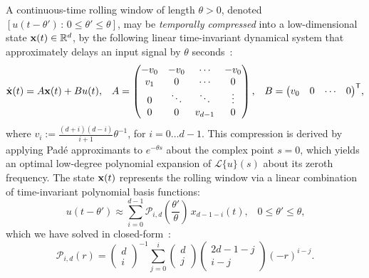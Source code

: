 A continuous-time rolling window of length $\theta > 0$, denoted $[ u(t - \theta') \,:\, 0 \le \theta' \le \theta ]$, may be \emph{temporally compressed} into a low-dimensional state $\mathbf{x}(t) \in \mathbb{R}^d$, by the following linear time-invariant dynamical system that approximately delays an input signal by $\theta$ seconds~\citep{voelker2018}:
\begin{equation} \label{eq:delay-system}
  \dot{\mathbf{x}}(t) = A\mathbf{x}(t) + Bu(t) \text{,} \quad
  A = \begin{pmatrix} -v_0 & -v_0 & \cdots & -v_0 \\ v_1 & 0 & \cdots & 0 \\ 0 & \ddots & \ddots & \vdots \\ 0 & 0 & v_{d-1} & 0\end{pmatrix} \text{,} \quad 
  B = {\begin{pmatrix} v_0 & 0 & \cdots & 0\end{pmatrix}}^\mathsf{T} \text{,} 
\end{equation}
where $v_i := \frac{(d+i)(d-i)}{i+1} \theta^{-1}$, %
for $i = 0 \ldots d-1$.
This compression is derived by applying Pad\'e approximants to $e^{-\theta s}$ about the complex point $s=0$, which yields an optimal low-degree polynomial expansion of $\mathcal{L}\{u\}(s)$ about its zeroth frequency.
The state $\mathbf{x}(t)$ represents the rolling window via a linear combination of time-invariant polynomial basis functions:
\begin{equation} \label{eq:basis-interpretation}
\boxed{u(t - \theta') \approx \sum_{i=0}^{d-1} \mathcal{P}_{i,d} \left(\frac{\theta'}{\theta} \right) \, x_{d-1-i}(t) \text{,} \quad 0 \le \theta' \le \theta \text{,}}
\end{equation}
which we have solved in closed-form~\citep[][eq.~14]{voelker2018}:
\begin{equation} \label{eq:basis-functions}
\mathcal{P}_{i,d}(r) = \begin{pmatrix}d \\ i\end{pmatrix}^{-1} \sum_{j=0}^i \begin{pmatrix}d \\ j\end{pmatrix} \begin{pmatrix}2d - 1 - j \\ i - j\end{pmatrix} \left( -r \right)^{i - j} \text{.} %
\end{equation}
